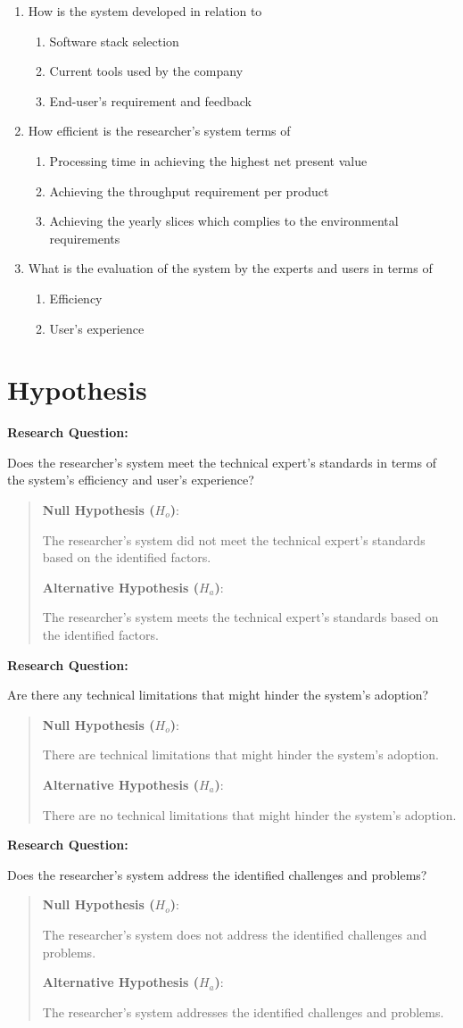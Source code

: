 \documentclass[12pt]{report}
\newcommand{\hypothesis}[3]{
\noindent \textbf{Research Question:}
\par#1
\begin{quotation}
    \noindent \textbf{Null Hypothesis ($H_o$)}:
    \par#2

    \noindent \textbf{Alternative Hypothesis ($H_a$)}:
    \par#3
\end{quotation}
}
\begin{document}
\begin{enumerate}
    \item How is the system developed in relation to
            \begin{enumerate}
                \item Software stack selection
                \item Current tools used by the company
                \item End-user's requirement and feedback
            \end{enumerate}
    \item How efficient is the researcher's system terms of
        \begin{enumerate}
            \item Processing time in achieving the highest net present value
            \item Achieving the throughput requirement per product
            \item Achieving the yearly slices which complies to the environmental requirements
        \end{enumerate}
    \item What is the evaluation of the system by the experts and users in terms of
        \begin{enumerate}
            \item Efficiency
            \item User's experience
        \end{enumerate}
\end{enumerate}

\section{Hypothesis}

\hypothesis{
Does the researcher's system meet the technical expert's standards in terms of the system's efficiency and user's experience?
}{
The researcher's system did not meet the technical expert's standards based on the identified factors.
}{
The researcher's system meets the technical expert's standards based on the identified factors.
}

\hypothesis{
Are there any technical limitations that might hinder the system's adoption?
}{
There are technical limitations that might hinder the system's adoption.
}{
There are no technical limitations that might hinder the system's adoption.
}

\hypothesis{
Does the researcher's system address the identified challenges and problems?
}{
The researcher's system does not address the identified challenges and problems.
}{
The researcher's system addresses the identified challenges and problems.
}
\end{document}
